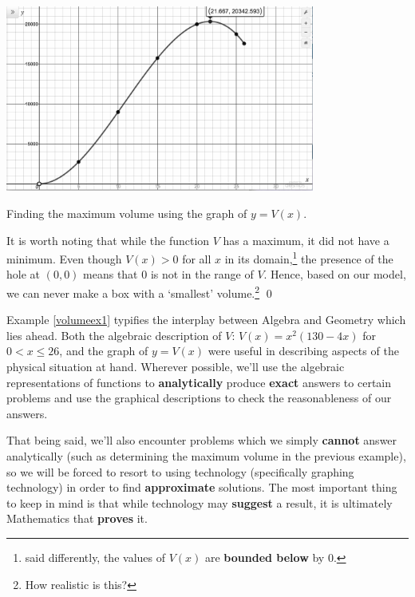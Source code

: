 \documentclass{ximera}
\begin{document}
\begin{example}
\begin{enumerate}
\begin{center}

\includegraphics[width=4in]{./FunctionsandtheirRepresentationsGraphics/VolumeEx02.jpg} 

Finding the maximum volume using the graph of $y = V(x)$.

\end{center}

\pagebreak

It is worth noting that while the function $V$ has a maximum, it did not have a minimum.  Even though $V(x)>0$ for all $x$ in its domain,\footnote{said differently, the values of $V(x)$ are \textbf{bounded below} by $0$.} the presence of the hole at $(0,0)$ means that $0$ is not in the range of $V$.  Hence, based on our model, we can never make a box with a  `smallest' volume.\footnote{How realistic is this?}  \qed

\end{enumerate}
\end{example}

\medskip

Example \ref{volumeex1} typifies the interplay between Algebra and Geometry which lies ahead.  Both the algebraic description of  $V$: $V(x) = x^2 (130 - 4x)$ for $0 < x \leq 26$, and the graph of $y=V(x)$ were useful in describing aspects of the physical situation at hand.  Wherever possible, we'll use the algebraic representations of functions to \textbf{analytically} produce \textbf{exact} answers to certain problems and use the graphical descriptions to check the reasonableness of our answers. 

\medskip

That being said, we'll also encounter problems which we simply \textbf{cannot} answer analytically (such as determining the maximum volume in the previous example), so we will be forced to resort to using technology (specifically graphing technology) in order to find \textbf{approximate} solutions.  The most important thing to keep in mind is that while technology may \textbf{suggest} a result, it is ultimately Mathematics that \textbf{proves} it. 
\end{document}
